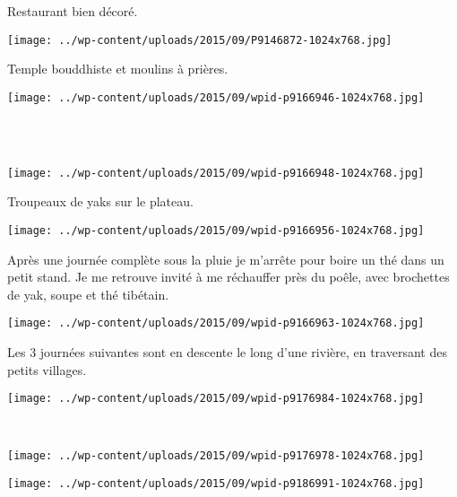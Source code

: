  Restaurant bien décoré.\\
 \vspace{1.25mm}
\begin{center} \texttt{[image: ../wp-content/uploads/2015/09/P9146872-1024x768.jpg]} \end{center}

  Temple bouddhiste et moulins à prières.
\begin{center} \texttt{[image: ../wp-content/uploads/2015/09/wpid-p9166946-1024x768.jpg]} \end{center}
\vspace{-\topsep}
\pagebreak
~\\~\\
\vspace{0.5mm}
\begin{center} \texttt{[image: ../wp-content/uploads/2015/09/wpid-p9166948-1024x768.jpg]} \end{center}

 Troupeaux de yaks sur le plateau.\\
\begin{center} \texttt{[image: ../wp-content/uploads/2015/09/wpid-p9166956-1024x768.jpg]} \end{center}
\vspace{-\topsep}
\pagebreak

 Après une journée complète sous la pluie je m'arrête pour boire un thé dans un petit stand. Je me retrouve invité à me réchauffer près du poêle, avec brochettes de yak, soupe et thé tibétain.
\begin{center} \texttt{[image: ../wp-content/uploads/2015/09/wpid-p9166963-1024x768.jpg]} \end{center}

 Les 3 journées suivantes sont en descente le long d'une rivière, en traversant des petits villages.
\begin{center} \texttt{[image: ../wp-content/uploads/2015/09/wpid-p9176984-1024x768.jpg]} \end{center}
\vspace{-\topsep}
\pagebreak

~
\vspace{0.75mm}
\begin{center} \texttt{[image: ../wp-content/uploads/2015/09/wpid-p9176978-1024x768.jpg]} \end{center}
\begin{center} \texttt{[image: ../wp-content/uploads/2015/09/wpid-p9186991-1024x768.jpg]} \end{center}
\vspace{-\topsep}
\vspace{-3.25mm}
\pagebreak

